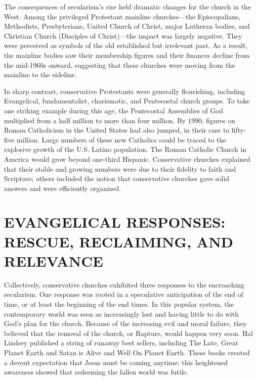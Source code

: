 The consequences of secularism’s rise held dramatic changes for the church in the West. Among the
privileged Protestant mainline churches—the Episcopalians, Methodists, Presbyterians, United Church
of Christ, major Lutheran bodies, and Christian Church (Disciples of Christ)—the impact was largely
negative. They were perceived as symbols of the old established but irrelevant past. As a result,
the mainline bodies saw their membership figures and their finances decline from the mid-1960s
onward, suggesting that these churches were moving from the mainline to the sideline.

In sharp contrast, conservative Protestants were generally flourishing, including Evangelical,
fundamentalist, charismatic, and Pentecostal church groups. To take one striking example during this
age, the Pentecostal Assemblies of God multiplied from a half million to more than four million. By
1990, figures on Roman Catholicism in the United States had also jumped, in their case to fifty-five
million. Large numbers of these new Catholics could be traced to the explosive growth of the U.S.
Latino population. The Roman Catholic Church in America would grow beyond one-third Hispanic.
Conservative churches explained that their stable and growing numbers were due to their fidelity to
faith and Scripture; others included the notion that conservative churches gave solid answers and
were efficiently organized.

\section{EVANGELICAL RESPONSES: RESCUE, RECLAIMING, AND RELEVANCE}

Collectively, conservative churches exhibited three responses to the encroaching secularism. One
response was rooted in a speculative anticipation of the end of time, or at least the beginning of
the end times. In this popular system, the contemporary world was seen as increasingly lost and
having little to do with God’s plan for the church. Because of the increasing evil and moral
failure, they believed that the removal of the church, or Rapture, would happen very soon. Hal
Lindsey published a string of runaway best sellers, including The Late, Great Planet Earth and Satan
is Alive and Well On Planet Earth. These books created a devout expectation that Jesus must be
coming anytime; this heightened awareness showed that redeeming the fallen world was futile.

